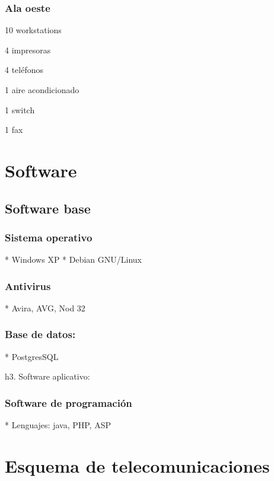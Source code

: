 \documentclass[a4paper,11pt,oneside]{article}
\begin{document}
\subsubsection*{Ala oeste}
\begin{itemize*}
\item 10 workstations
\item 4 impresoras
\item 4 teléfonos
\item 1 aire acondicionado
\item 1 switch
\item 1 fax
\end{itemize*}
%
\section{Software}

\subsection{Software base}

\subsubsection*{Sistema operativo}
 
* Windows XP 
* Debian GNU/Linux

\subsubsection*{Antivirus}

* Avira, AVG, Nod 32

\subsubsection*{Base de datos:}

* PostgresSQL

h3. Software aplicativo:

\subsubsection*{Software de programación}

* Lenguajes: java, PHP, ASP

\section{Esquema de telecomunicaciones}
\end{document}
